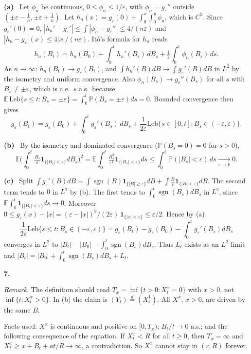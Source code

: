 \documentclass[11pt,a4paper]{article}
\newcommand{\E}{\mathbb{E}}
\renewcommand{\P}{\mathbb{P}}
\newcommand{\1}{\mathbf{1}}
\newcommand{\Leb}{\mathrm{Leb}}
\newcommand{\sgn}{\operatorname{sgn}}
\newcommand{\prob}[1]{\par\medskip\noindent\textbf{#1}\quad}
\newcommand{\sub}[1]{\par\smallskip\noindent\textbf{#1}\ }
\newcommand{\note}[1]{\par\noindent\emph{Remark.} #1}
\begin{document}
\sub{(a)} Let $\phi_n$ be continuous, $0\le\phi_n\le1/\varepsilon$, with $\phi_n=g_\varepsilon''$ outside
$(\pm\varepsilon-\frac1n,\pm\varepsilon+\frac1n)$. Let $h_n(x)=g_\varepsilon(0)+\int_0^x\int_0^y\phi_n$, which is $C^2$. Since
$g_\varepsilon'(0)=0$, $|h_n'-g_\varepsilon'|\le\int|\phi_n-g_\varepsilon''|\le4/(n\varepsilon)$ and
$|h_n-g_\varepsilon|(x)\le4|x|/(n\varepsilon)$. Itô's formula for $h_n$ reads
\[
h_n(B_t)=h_n(B_0)+\int_0^th_n'(B_s)\,dB_s+\tfrac12\int_0^t\phi_n(B_s)\,ds .
\]
As $n\to\infty$: $h_n(B_t)\to g_\varepsilon(B_t)$, and $\int h_n'(B)dB\to\int g_\varepsilon'(B)dB$ in $L^2$ by the isometry and
uniform convergence. Also $\phi_n(B_s)\to g_\varepsilon''(B_s)$ for all $s$ with $B_s\ne\pm\varepsilon$, which is a.e.\ $s$ a.s.\
because $\E\,\Leb\{s\le t:B_s=\pm\varepsilon\}=\int_0^t\P(B_s=\pm\varepsilon)ds=0$. Bounded convergence then gives
\[
g_\varepsilon(B_t)=g_\varepsilon(B_0)+\int_0^tg_\varepsilon'(B_s)\,dB_s+\frac1{2\varepsilon}\Leb\{s\in[0,t]:B_s\in(-\varepsilon,\varepsilon)\}.
\]

\sub{(b)} By the isometry and dominated convergence ($\P(B_s=0)=0$ for $s>0$),
\[
\E\Big(\int_0^t\tfrac{B_s}{\varepsilon}\1_{\{|B_s|<\varepsilon\}}dB_s\Big)^2=\E\int_0^t\tfrac{B_s^2}{\varepsilon^2}\1_{\{|B_s|<\varepsilon\}}ds
\le\int_0^t\P(|B_s|<\varepsilon)\,ds\xrightarrow[\varepsilon\to0]{}0 .
\]

\sub{(c)} Split $\int g_\varepsilon'(B)dB=\int\sgn(B)\1_{\{|B|\ge\varepsilon\}}dB+\int\frac{B}{\varepsilon}\1_{\{|B|<\varepsilon\}}dB$.
The second term tends to $0$ in $L^2$ by (b). The first tends to $\int_0^t\sgn(B_s)dB_s$ in $L^2$, since
$\E\int_0^t\1_{\{|B_s|<\varepsilon\}}ds\to0$. Moreover $0\le g_\varepsilon(x)-|x|=(\varepsilon-|x|)^2/(2\varepsilon)\,\1_{\{|x|<\varepsilon\}}\le\varepsilon/2$.
Hence by (a)
\[
\frac1{2\varepsilon}\Leb\{s\le t:B_s\in(-\varepsilon,\varepsilon)\}=g_\varepsilon(B_t)-g_\varepsilon(B_0)-\int_0^tg_\varepsilon'(B_s)dB_s
\]
converges in $L^2$ to $|B_t|-|B_0|-\int_0^t\sgn(B_s)dB_s$. Thus $L_t$ exists as an $L^2$-limit and
$|B_t|=|B_0|+\int_0^t\sgn(B_s)dB_s+L_t$.

\prob{7.}
\note{The definition should read $T_x=\inf\{t>0:X^x_t=0\}$ with $x>0$, not $\inf\{t:X^x_t>0\}$. In (b) the claim is
$(Y_t)\overset d=(X^1_t)$. All $X^x$, $x>0$, are driven by the same $B$.}

Facts used: $X^x$ is continuous and positive on $[0,T_x)$; $B_t/t\to0$ a.s.; and the
following consequence of the equation. If $X^x_t<R$ for all $t\ge0$, then $T_x=\infty$ and
$X^x_t\ge x+B_t+at/R\to\infty$, a contradiction. So $X^x$ cannot stay in $(r,R)$ forever.
\end{document}
